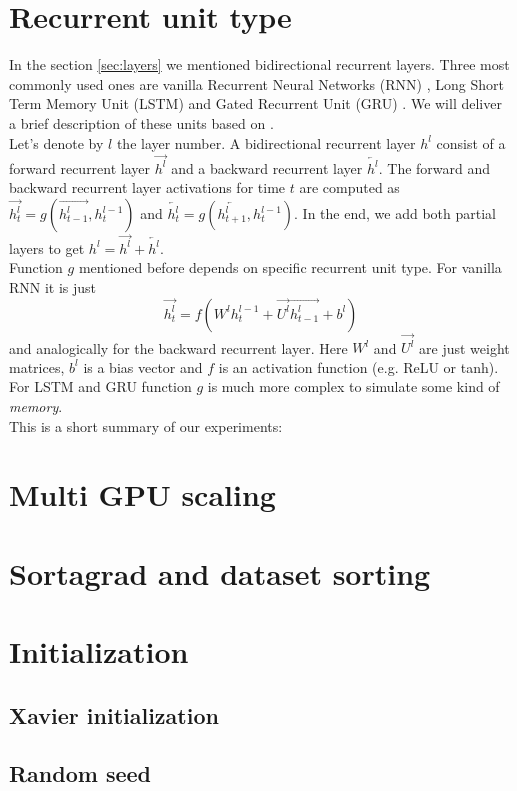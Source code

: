 \documentclass[licencjacka,en]{pracamgr}
\begin{document}
\section{Recurrent unit type}
In the section \ref{sec:layers} we mentioned bidirectional recurrent layers. Three most commonly used ones are vanilla Recurrent Neural Networks (RNN) \cite{RNN}, Long Short Term Memory Unit (LSTM) \cite{LSTM} and Gated Recurrent Unit (GRU) \cite{GRU}. We will deliver a brief description of these units based on \cite{DS2}. \\
Let's denote by $l$ the layer number. A bidirectional recurrent layer $h^l$ consist of a forward recurrent layer $\overrightarrow{h^l}$ and a backward recurrent layer $\overleftarrow{h^l}$. The forward and backward recurrent layer activations for time $t$ are computed as $\overrightarrow{h^l_t} = g(\overrightarrow{h^l_{t - 1}}, h^{l-1}_t)$ and $\overleftarrow{h^l_t} = g(\overleftarrow{h^l_{t+1}}, h^{l-1}_t)$. In the end, we add both partial layers to get $h^l = \overrightarrow{h^l} + \overleftarrow{h^l}$.\\
Function $g$ mentioned before depends on specific recurrent unit type. For vanilla RNN it is just
$$\overrightarrow{h^l_t} = f(W^l h^{l-1}_t + \overrightarrow{U^l} \overrightarrow{h^l_{t - 1}} + b^l)$$
and analogically for the backward recurrent layer. Here $W^l$ and $\overrightarrow{U^l}$ are just weight matrices, $b^l$ is a bias vector and $f$ is an activation function (e.g. ReLU or tanh). For LSTM and GRU function $g$ is much more complex to simulate some kind of \textit{memory}.\\
This is a short summary of our experiments:

\section{Multi GPU scaling}

\section{Sortagrad and dataset sorting}

\section{Initialization}
\subsection{Xavier initialization}
\subsection{Random seed}
\end{document}
